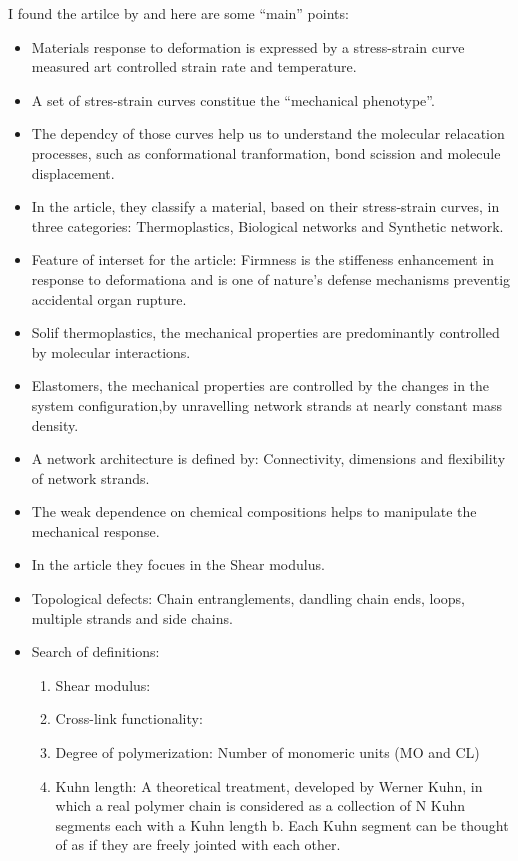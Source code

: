 \documentclass[a4paper, 11pt, oneside]{researchjournal} %
\begin{document}
I found the artilce by \cite{sheikoArchitecturalCodeRubber2019} and here are some ``main'' points:
\begin{itemize}
	\item Materials response to deformation is expressed by a stress-strain curve measured art controlled strain rate and temperature.
	\item A set of stres-strain curves constitue the ``mechanical phenotype''.
	\item The dependcy of those curves help us to understand the molecular relacation processes, such as conformational tranformation, bond scission and molecule displacement.
	\item In the article, they classify a material, based on their stress-strain curves, in three categories: Thermoplastics, Biological networks and  Synthetic network.
	\item Feature of interset for the article: Firmness is the stiffeness enhancement in response to deformationa and is one of nature's defense mechanisms preventig accidental organ rupture.
	\item Solif thermoplastics, the mechanical properties are predominantly controlled by molecular interactions.
	\item Elastomers, the mechanical properties are controlled by the changes in the system configuration,by unravelling network strands at nearly constant mass density.
	\item A network architecture is defined by: Connectivity, dimensions and flexibility of network strands.
	\item The weak dependence on chemical compositions helps to manipulate the mechanical response.
	\item In the article they focues in the Shear modulus.
	\item Topological defects: Chain entranglements, dandling chain ends, loops, multiple strands and side chains.
	\item Search of definitions:
		\begin{enumerate}
			\item Shear modulus:
			\item Cross-link functionality:
			\item Degree of polymerization: Number of monomeric units (MO and CL)
			\item Kuhn length:  A theoretical treatment, developed by Werner Kuhn, in which a real polymer chain is considered as a collection of N Kuhn segments each with a Kuhn length b. Each Kuhn segment can be thought of as if they are freely jointed with each other.

\end{enumerate}
\end{itemize}
\end{document}
